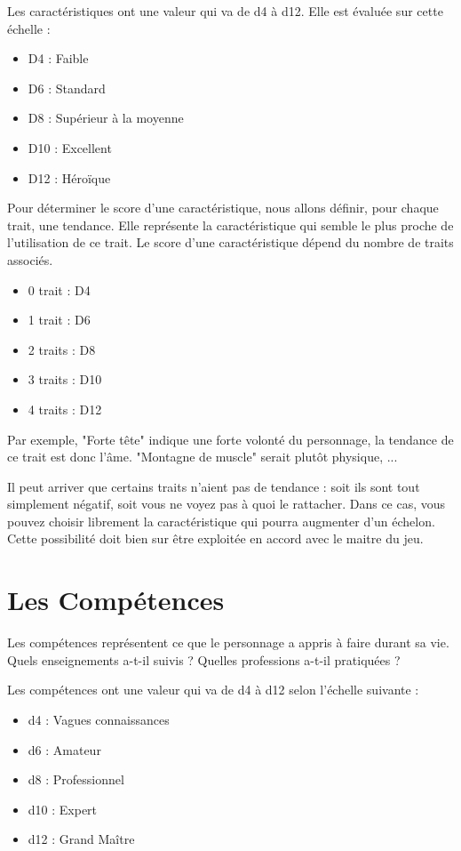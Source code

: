 Les caractéristiques ont une valeur qui va de d4 à d12. Elle est évaluée sur cette échelle :

\begin{itemize}
\item D4 : Faible
\item D6 : Standard
\item D8 : Supérieur à la moyenne
\item D10 : Excellent
\item D12 : Héroïque
\end{itemize}

Pour déterminer le score d'une caractéristique, nous allons définir, pour chaque trait, une tendance. Elle représente la caractéristique qui semble le plus proche de l'utilisation de ce trait. Le score d'une caractéristique dépend du nombre de traits associés.

\begin{itemize}
\item 0 trait : D4
\item 1 trait : D6
\item 2 traits : D8
\item 3 traits : D10
\item 4 traits : D12
\end{itemize}

Par exemple, "Forte tête" indique une forte volonté du personnage, la tendance de ce trait est donc l'âme. "Montagne de muscle" serait plutôt physique, ...

Il peut arriver que certains traits n'aient pas de tendance : soit ils sont tout simplement négatif, soit vous ne voyez pas à quoi le rattacher. Dans ce cas, vous pouvez choisir librement la caractéristique qui pourra augmenter d'un échelon. Cette possibilité doit bien sur être exploitée en accord avec le maitre du jeu.

\section{Les Compétences}

Les compétences représentent ce que le personnage a appris à faire durant sa vie. Quels enseignements a-t-il suivis ? Quelles professions a-t-il pratiquées ? 

Les compétences ont une valeur qui va de d4 à d12 selon l'échelle suivante : 

\begin{itemize}
\item d4 : Vagues connaissances
\item d6 : Amateur
\item d8 : Professionnel
\item d10 : Expert
\item d12 : Grand Maître
\end{itemize}

